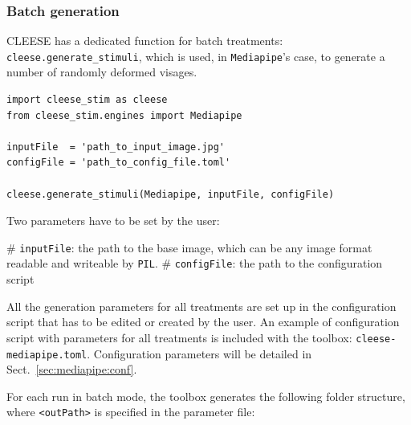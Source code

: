 \documentclass[oneside,10pt]{article}
\begin{document}
\subsubsection{Batch generation}

CLEESE has a dedicated function for batch treatments:
\texttt{cleese.generate\_stimuli}, which is used, in \texttt{Mediapipe}'s case,
to generate a number of randomly deformed visages.

\vspace{8pt}
\begin{verbatim}
import cleese_stim as cleese
from cleese_stim.engines import Mediapipe

inputFile  = 'path_to_input_image.jpg'
configFile = 'path_to_config_file.toml'

cleese.generate_stimuli(Mediapipe, inputFile, configFile)
\end{verbatim}
\vspace{8pt}

Two parameters have to be set by the user:

\vspace{5pt}
\begin{easylist}[itemize]
# \texttt{inputFile}: the path to the base image, which can be any image format
        readable and writeable by \texttt{PIL}.
# \texttt{configFile}: the path to the configuration script
\end{easylist}
\vspace{8pt}

All the generation parameters for all treatments are set up in the
configuration script that has to be edited or created by the user. An example
of configuration script with parameters for all treatments is included with the
toolbox: \texttt{cleese-mediapipe.toml}. Configuration parameters will be
detailed in Sect.~\ref{sec:mediapipe:conf}.

For each run in batch mode, the toolbox generates the following folder
structure, where \texttt{<outPath>} is specified in the parameter file:
\end{document}
